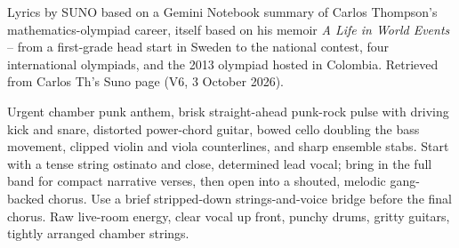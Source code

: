 
\begin{notes}
Lyrics by SUNO based on a Gemini Notebook summary of Carlos Thompson's mathematics-olympiad career, itself based on his memoir \emph{A Life in World Events} -- from a first-grade head start in Sweden to the national contest, four international olympiads, and the 2013 olympiad hosted in Colombia. Retrieved from Carlos Th's Suno page (V6, 3 October 2026).
\end{notes}
\begin{style}
Urgent chamber punk anthem, brisk straight-ahead punk-rock pulse with driving kick and snare, distorted power-chord guitar, bowed cello doubling the bass movement, clipped violin and viola counterlines, and sharp ensemble stabs. Start with a tense string ostinato and close, determined lead vocal; bring in the full band for compact narrative verses, then open into a shouted, melodic gang-backed chorus. Use a brief stripped-down strings-and-voice bridge before the final chorus. Raw live-room energy, clear vocal up front, punchy drums, gritty guitars, tightly arranged chamber strings.
\end{style}
